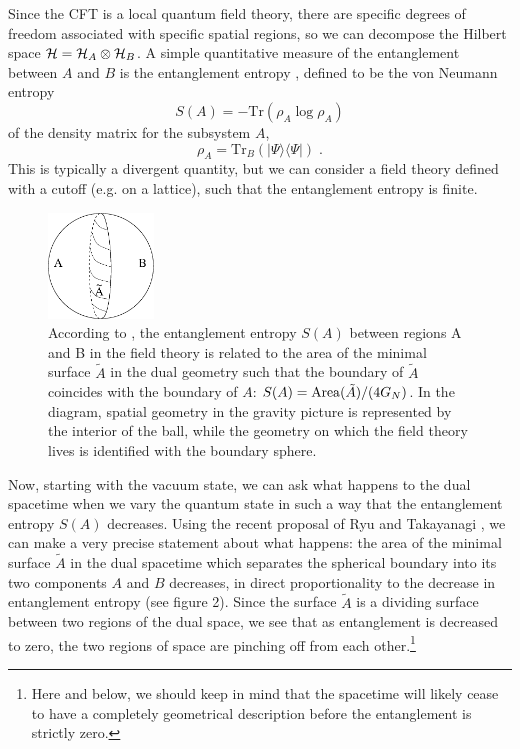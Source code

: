 \documentclass[12pt,epsf]{article}
\renewcommand{\(}{\left(}
\renewcommand{\)}{\right)}
\newcommand{\tr}{\mathrm{Tr}}
\begin{document}
Since the CFT is a local quantum field theory, there are specific degrees of freedom associated with specific spatial regions, so we can decompose the Hilbert space ${\cal H} = {\cal H}_A \otimes {\cal H}_B$. A simple quantitative measure of the entanglement between $A$ and $B$ is the entanglement entropy \cite{nc}, defined to be the von Neumann entropy
\[
S(A) = - \tr( \rho_A \log \rho_A)
\]
of the density matrix for the subsystem $A$,
\[
\rho_A = \tr_{B}(|\Psi \rangle \langle \Psi |) \; .
\]
This is typically a divergent quantity, but we can consider a field theory defined with a cutoff (e.g. on a lattice), such that the entanglement entropy is finite.
\begin{figure}
\centering
\includegraphics[width=0.25\textwidth]{holent.eps}
\caption{According to \cite{rt}, the entanglement entropy $S(A)$ between regions A and B in the field theory is related to the area of the minimal surface $\tilde{A}$ in the dual geometry such that the boundary of $\tilde{A}$ coincides with the boundary of $A$: $S(A) = {\rm Area}(\tilde{A})/(4 G_N)$. In the diagram, spatial geometry in the gravity picture is represented by the interior of the ball, while the geometry on which the field theory lives is identified with the boundary sphere.}
\end{figure}
Now, starting with the vacuum state, we can ask what happens to the dual spacetime when we vary the quantum state in such a way that the entanglement entropy $S(A)$ decreases. Using the recent proposal of Ryu and Takayanagi \cite{rt}, we can make a very precise statement about what happens: the area of the minimal surface $\tilde{A}$ in the dual spacetime which separates the spherical boundary into its two components $A$ and $B$ decreases, in direct proportionality to the decrease in entanglement entropy (see figure 2). Since the surface $\tilde{A}$ is a dividing surface between two regions of the dual space, we see that as entanglement is decreased to zero, the two regions of space are pinching off from each other.\footnote{Here and below, we should keep in mind that the spacetime will likely cease to have a completely geometrical description before the entanglement is strictly zero.}
\end{document}
